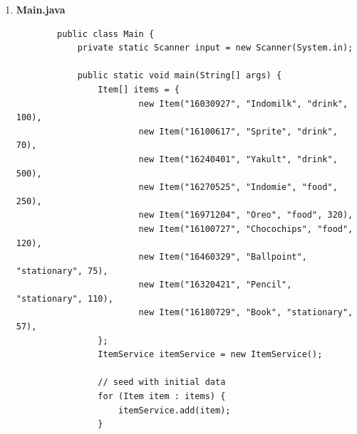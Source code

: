 \documentclass[12pt,titlepage]{article}
\begin{document}
\begin{enumerate}
{\begin{verbatim}
            /**
             * Sorts the items using bubble sort algorithm based on its stock (ascending)
             */
            public void sort() {
                for (int i = 0; i < currentIndex - 1; i++) {
                    for (int j = 1; j < currentIndex - i; j++) {
                        if (items[j].stock < items[j - 1].stock) {
                            Item tmp = items[j];
                            items[j] = items[j - 1];
                            items[j - 1] = tmp;
                        }
                    }
                }
            }

            /**
             * Shows the item using predefined format to stdout
             * @param item The item you want to show
             */
            public void showFormattedItem(Item item) {
                System.out.println("------------------");
                System.out.println("Item Code\t: " + item.itemCode);
                System.out.println("Name\t\t: " + item.name);
                System.out.println("Category\t: " + item.category);
                System.out.println("Stock\t\t: " + item.stock);
                System.out.println("------------------");
            }
        }
        \end{verbatim}
    }
    \item {
        \textbf{Main.java}

        \begin{verbatim}
        public class Main {
            private static Scanner input = new Scanner(System.in);

            public static void main(String[] args) {
                Item[] items = {
                        new Item("16030927", "Indomilk", "drink", 100),
                        new Item("16100617", "Sprite", "drink", 70),
                        new Item("16240401", "Yakult", "drink", 500),
                        new Item("16270525", "Indomie", "food", 250),
                        new Item("16971204", "Oreo", "food", 320),
                        new Item("16100727", "Chocochips", "food", 120),
                        new Item("16460329", "Ballpoint", "stationary", 75),
                        new Item("16320421", "Pencil", "stationary", 110),
                        new Item("16180729", "Book", "stationary", 57),
                };
                ItemService itemService = new ItemService();

                // seed with initial data
                for (Item item : items) {
                    itemService.add(item);
                }


\end{verbatim}}
\end{enumerate}
\end{document}
